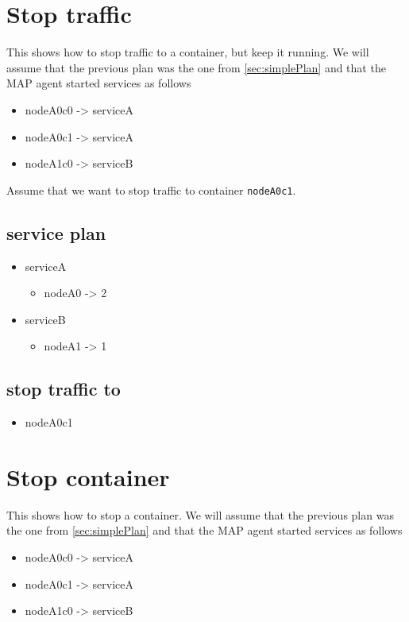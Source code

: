 \documentclass[12pt]{article}
\begin{document}
\section{Stop traffic}

This shows how to stop traffic to a container, but keep it running.
We will assume that the previous plan was the one from \autoref{sec:simplePlan} and that the MAP agent started services as follows
\begin{itemize}
\item nodeA0c0 -> serviceA
\item nodeA0c1 -> serviceA
\item nodeA1c0 -> serviceB
\end{itemize}

Assume that we want to stop traffic to container \texttt{nodeA0c1}.

\subsection{service plan}

\begin{itemize}
\item serviceA
  \begin{itemize}
  \item nodeA0 -> 2
  \end{itemize}

\item serviceB
  \begin{itemize}
  \item nodeA1 -> 1
  \end{itemize}

\end{itemize}

\subsection{stop traffic to}
\begin{itemize}
\item nodeA0c1
\end{itemize}


\section{Stop container}

This shows how to stop a container. 
We will assume that the previous plan was the one from \autoref{sec:simplePlan} and that the MAP agent started services as follows
\begin{itemize}
\item nodeA0c0 -> serviceA
\item nodeA0c1 -> serviceA
\item nodeA1c0 -> serviceB
\end{itemize}
\end{document}
